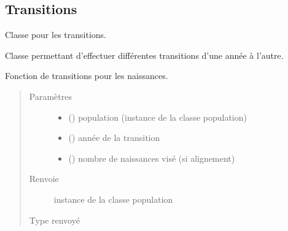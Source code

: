 \documentclass[letterpaper,10pt,french]{sphinxmanual}
\begin{document}
\subsection{Transitions}
\label{\detokenize{code:transitions}}

\begin{fulllineitems}
\label{\detokenize{code:simgen.update}}
Classe pour les transitions.

Classe permettant d’effectuer différentes transitions d’une année à l’autre.

\begin{fulllineitems}
\label{\detokenize{code:simgen.update.birth}}
Fonction de transitions pour les naissances.
\begin{quote}\begin{description}
\item[{Paramètres}] \leavevmode\begin{itemize}
\item {} 
 ({\hyperref[\detokenize{code:simgen.population}]{}}) \textendash{} population (instance de la classe population)

\item {} 
 () \textendash{} année de la transition

\item {} 
 () \textendash{} nombre de naissances visé (si alignement)

\end{itemize}

\item[{Renvoie}] \leavevmode
instance de la classe population

\item[{Type renvoyé}] \leavevmode
{\hyperref[\detokenize{code:simgen.population}]{}}


\end{description}
\end{quote}
\end{fulllineitems}
\end{fulllineitems}
\end{document}
